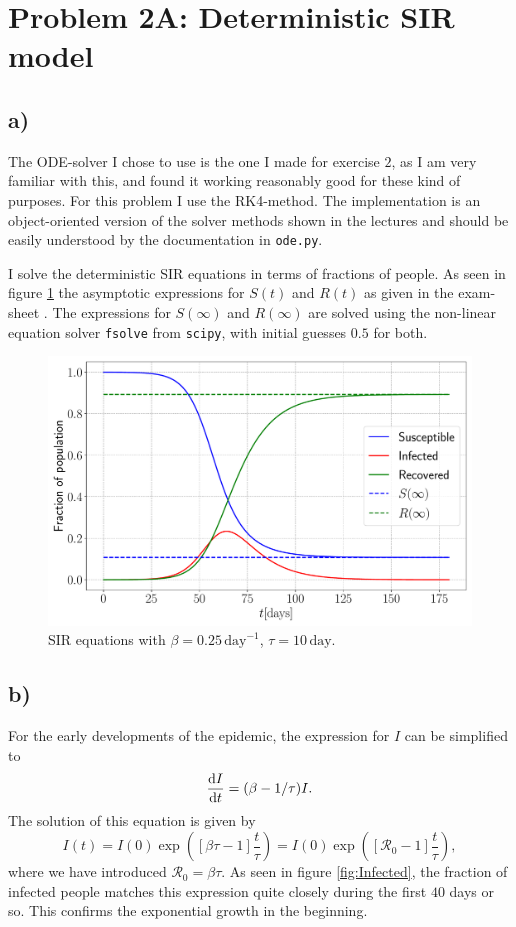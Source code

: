 \section{Problem 2A: Deterministic SIR model}

\subsection{a)}

The ODE-solver I chose to use is the one I made for exercise $2$, as I am very familiar with this, and found it working reasonably good for these kind of purposes. For this problem I use the RK4-method. The implementation is an object-oriented version of the solver methods shown in the lectures and should be easily understood by the documentation in \lstinline|ode.py|.

I solve the deterministic SIR equations in terms of fractions of people. As seen in figure \ref{fig:SIR} the asymptotic expressions for $S(t)$ and $R(t)$ as given in the exam-sheet \cite{sheet}. The expressions for $S(\infty)$ and $R(\infty)$ are solved using the non-linear equation solver \lstinline|fsolve| from \lstinline|scipy|, with initial guesses $0.5$ for both.

\begin{figure}[htb]
	\centering
	\includegraphics[width=0.8\columnwidth]{../fig/2Aa_SIR.pdf}
	\caption{SIR equations with $\beta = 0.25 \, \mathrm{day}^{-1}$, $\tau = 10 \, \mathrm{day}$.}
	\label{fig:SIR}
\end{figure}

\subsection{b)}

For the early developments of the epidemic, the expression for $I$ can be simplified to \cite{sheet}
\begin{equation}\label{eq:I_simp}
	\frac{\text{d} I}{\text{d} t} = (\beta - 1/\tau) I.
\end{equation}
The solution of this equation is given by
\begin{equation}\label{eq:Iexp}
	I(t) = I(0) \exp{\left(\left[ \beta \tau - 1 \right] \frac{t}{\tau}\right)} = I(0) \exp{\left(\left[ \mathcal{R}_0 - 1 \right] \frac{t}{\tau} \right)},
\end{equation}
where we have introduced $\mathcal{R}_0 = \beta\tau$. As seen in figure \ref{fig:Infected}, the fraction of infected people matches this expression quite closely during the first $40$ days or so. This confirms the exponential growth in the beginning. 

